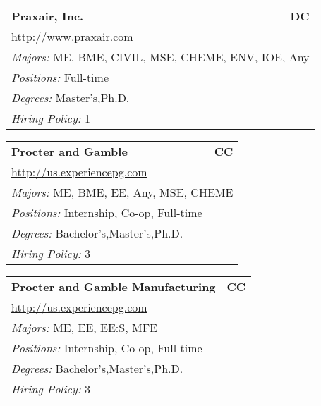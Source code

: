 \documentclass[twoside]{article}
\begin{document}
\begin{center}
\begin{multicols}{3}
\begin{FlushLeft}
\begin{minipage}{.9\columnwidth}
\end{minipage}
 
\begin{minipage}{.9\columnwidth}\begin{tabularx}{.95\columnwidth}{Xr}
                 {\Large\bf Praxair, Inc.} & {\Large\bf DC}\\
    \multicolumn{2}{p{.95\columnwidth}}{\url{http://www.praxair.com}}\\
    \multicolumn{2}{p{.95\columnwidth}}{\emph{Majors:} ME, BME, CIVIL, MSE, CHEME, ENV, IOE, Any}\\
    \multicolumn{2}{p{.95\columnwidth}}{\emph{Positions:} Full-time}\\
    \multicolumn{2}{p{.95\columnwidth}}{\emph{Degrees:} Master's,Ph.D.}\\
    \multicolumn{2}{p{.95\columnwidth}}{\emph{Hiring Policy:} 1}\\
    \end{tabularx}
    
\end{minipage}
 
\begin{minipage}{.9\columnwidth}\begin{tabularx}{.95\columnwidth}{Xr}
                 {\Large\bf Procter and Gamble} & {\Large\bf CC}\\
    \multicolumn{2}{p{.95\columnwidth}}{\url{http://us.experiencepg.com}}\\
    \multicolumn{2}{p{.95\columnwidth}}{\emph{Majors:} ME, BME, EE, Any, MSE, CHEME}\\
    \multicolumn{2}{p{.95\columnwidth}}{\emph{Positions:} Internship, Co-op, Full-time}\\
    \multicolumn{2}{p{.95\columnwidth}}{\emph{Degrees:} Bachelor's,Master's,Ph.D.}\\
    \multicolumn{2}{p{.95\columnwidth}}{\emph{Hiring Policy:} 3}\\
    \end{tabularx}
    
\end{minipage}
 
\begin{minipage}{.9\columnwidth}\begin{tabularx}{.95\columnwidth}{Xr}
                 {\Large\bf Procter and Gamble Manufacturing} & {\Large\bf CC}\\
    \multicolumn{2}{p{.95\columnwidth}}{\url{http://us.experiencepg.com}}\\
    \multicolumn{2}{p{.95\columnwidth}}{\emph{Majors:} ME, EE, EE:S, MFE}\\
    \multicolumn{2}{p{.95\columnwidth}}{\emph{Positions:} Internship, Co-op, Full-time}\\
    \multicolumn{2}{p{.95\columnwidth}}{\emph{Degrees:} Bachelor's,Master's,Ph.D.}\\
    \multicolumn{2}{p{.95\columnwidth}}{\emph{Hiring Policy:} 3}\\
    \end{tabularx}
    

\end{minipage}
\end{FlushLeft}
\end{multicols}
\end{center}
\end{document}
